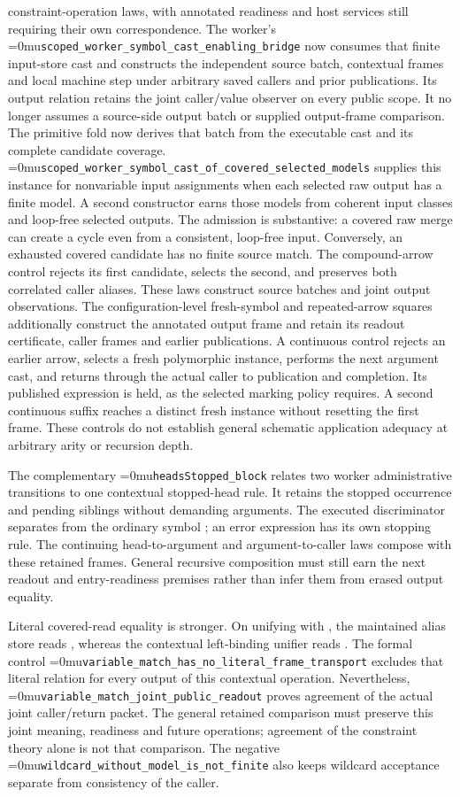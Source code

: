\documentclass[11pt,a4paper]{article}
\newcommand{\code}[1]{\texttt{\detokenize{#1}}}
\newcommand{\name}[1]{\textup{\Urlmuskip=0mu\relax\nolinkurl{#1}}}
\begin{document}
constraint-operation laws, with annotated readiness and host services still
requiring their own correspondence.
The worker's \name{scoped_worker_symbol_cast_enabling_bridge} now consumes
that finite input-store cast and constructs the independent source batch,
contextual frames and local machine step under arbitrary saved callers and
prior publications. Its output relation retains the joint caller/value
observer on every public scope. It no longer assumes a source-side output
batch or supplied output-frame comparison. The primitive fold now derives
that batch from the executable cast and its complete candidate coverage.
\name{scoped_worker_symbol_cast_of_covered_selected_models} supplies this
instance for nonvariable input assignments when each selected raw output
has a finite model. A second constructor earns those models from coherent
input classes and loop-free selected outputs. The admission is substantive:
a covered raw merge can create a cycle even from a consistent, loop-free
input. Conversely, an exhausted covered candidate has no finite source
match. The compound-arrow control rejects its first candidate, selects the
second, and preserves both correlated caller aliases. These laws construct
source batches and joint output observations. The configuration-level
fresh-symbol and repeated-arrow squares additionally construct the annotated
output frame and retain its readout certificate, caller frames and earlier
publications. A continuous control rejects an earlier arrow, selects a fresh
polymorphic instance, performs the next argument cast, and returns through
the actual caller to publication and completion. Its published expression
is held, as the selected marking policy requires. A second continuous suffix
reaches a distinct fresh instance without resetting the first frame. These
controls do not establish general schematic application adequacy at arbitrary
arity or recursion depth.

The complementary \name{headsStopped_block} relates two worker
administrative transitions to one contextual stopped-head rule. It retains
the stopped occurrence and pending siblings without demanding arguments.
The executed discriminator separates \code{Empty} from the ordinary symbol
\code{Error}; an error expression has its own stopping rule. The continuing
head-to-argument and argument-to-caller laws compose with these retained
frames. General recursive composition must still earn the next readout and
entry-readiness premises rather than infer them from erased output equality.

Literal covered-read equality is stronger. On unifying \code{$a} with
\code{$b}, the maintained alias store reads \code{$a}, whereas the contextual
left-binding unifier reads \code{$b}. The formal control
\name{variable_match_has_no_literal_frame_transport} excludes that literal
relation for every output of this contextual operation. Nevertheless,
\name{variable_match_joint_public_readout} proves agreement of the actual
joint caller/return packet. The general retained comparison must preserve
this joint meaning, readiness and future operations; agreement of the
constraint theory alone is not that comparison. The negative
\name{wildcard_without_model_is_not_finite} also keeps wildcard acceptance
separate from consistency of the caller.
\end{document}
